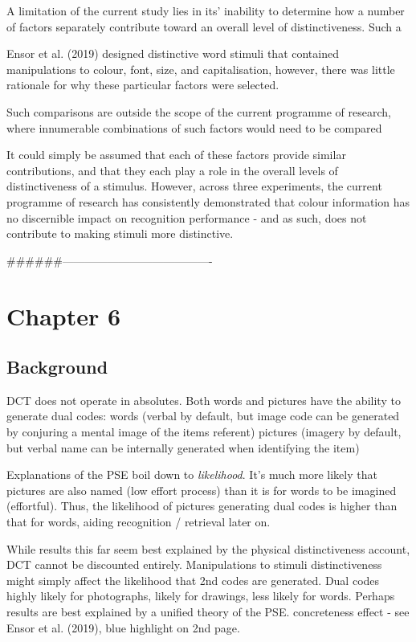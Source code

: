 \documentclass[
  11pt,
]{article}
\begin{document}
A limitation of the current study lies in its' inability to determine
how a number of factors separately contribute toward an overall level of
distinctiveness. Such a

Ensor et al. (2019) designed distinctive word stimuli that contained
manipulations to colour, font, size, and capitalisation, however, there
was little rationale for why these particular factors were selected.

Such comparisons are outside the scope of the current programme of
research, where innumerable combinations of such factors would need to
be compared

It could simply be assumed that each of these factors provide similar
contributions, and that they each play a role in the overall levels of
distinctiveness of a stimulus. However, across three experiments, the
current programme of research has consistently demonstrated that colour
information has no discernible impact on recognition performance - and
as such, does not contribute to making stimuli more distinctive.

\newpage

\#\#\#\#\#\#----------------------------------------

\newpage

\hypertarget{chapter-6}{%
\section{Chapter 6}\label{chapter-6}}

\hypertarget{background-4}{%
\subsection{Background}\label{background-4}}

DCT does not operate in absolutes. Both words and pictures have the
ability to generate dual codes: words (verbal by default, but image code
can be generated by conjuring a mental image of the items referent)
pictures (imagery by default, but verbal name can be internally
generated when identifying the item)

Explanations of the PSE boil down to \emph{likelihood}. It's much more
likely that pictures are also named (low effort process) than it is for
words to be imagined (effortful). Thus, the likelihood of pictures
generating dual codes is higher than that for words, aiding recognition
/ retrieval later on.

While results this far seem best explained by the physical
distinctiveness account, DCT cannot be discounted entirely.
Manipulations to stimuli distinctiveness might simply affect the
likelihood that 2nd codes are generated. Dual codes highly likely for
photographs, likely for drawings, less likely for words. Perhaps results
are best explained by a unified theory of the PSE. concreteness effect -
see Ensor et al. (2019), blue highlight on 2nd page.
\end{document}
